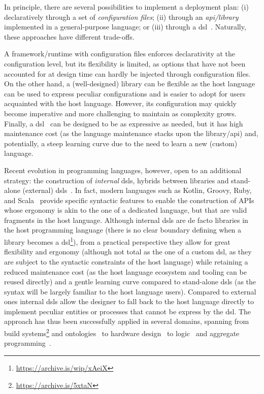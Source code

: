 \documentclass[conference]{IEEEtran}
\begin{document}
In principle, there are several possibilities to implement a deployment plan:
%
(i) declaratively through a set of \emph{configuration files};
(ii) through an \emph{\ac{api}/library} implemented in a general-purpose language;
or 
(iii) through a \ac{dsl}~\cite{dsl-book-voelter}. %
%
Naturally, these approaches have different trade-offs.

A framework/runtime with configuration files enforces declarativity at the configuration level,
but its flexibility is limited,
as options that have not been accounted for at design time can hardly be injected through configuration files.
%
On the other hand,
a (well-designed) library can be flexible as the host language can be used to express peculiar configurations
and is easier to adopt for users acquainted with the host language.
%
However,
its configuration may quickly become imperative and more challenging to maintain as complexity grows.
%
Finally, a \ac{dsl}~\cite{dsl-book-voelter} can be designed to be as expressive as needed,
but it has high maintenance cost
(as the language maintenance stacks upon the library/\ac{api}) and, potentially,
a steep learning curve due to the need to learn a new (custom) language.

Recent evolution in programming languages,
however,
open to an additional strategy:
the construction of \emph{internal} \acp{dsl},
hybrids between libraries and stand-alone (external) \acp{dsl}~\cite{dsl-book-voelter}.
%
In fact, modern languages such as Kotlin, Groovy, Ruby, and Scala~\cite{Riti2018}
provide specific syntactic features to enable the construction of APIs whose ergonomy is akin to the one of a dedicated language,
but that are valid fragments in the host language.
%
Although internal \acp{dsl} are de facto libraries in the host programming language
(there is no clear boundary defining when a library becomes a \ac{dsl}\footnote{\url{https://archive.is/wip/xAeiX}}),
from a practical perspective
they allow for great flexibility and ergonomy
(although not total as the one of a custom \ac{dsl}, as they are subject to the syntactic constraints of the host language)
while retaining a reduced maintenance cost
(as the host language ecosystem and tooling can be reused directly)
and a gentle learning curve compared to stand-alone \acp{dsl}
(as the syntax will be largely familiar to the host language users).
%
Compared to external ones
internal \acp{dsl} allow the designer to fall back to the host language directly
to implement peculiar entities or processes that cannot be express by the \ac{dsl}.
%
The approach has thus been successfully applied in several domains,
spanning from
build systems\footnote{\url{https://archive.is/5xtaN}}
and ontologies~\cite{DBLP:journals/jossw/Balhoff16} to
hardware design~\cite{DBLP:journals/trets/SerreP20} to
logic~\cite{2pkt-swx16} and aggregate programming~\cite{DBLP:journals/softx/CasadeiVAP22}.
%
\end{document}

